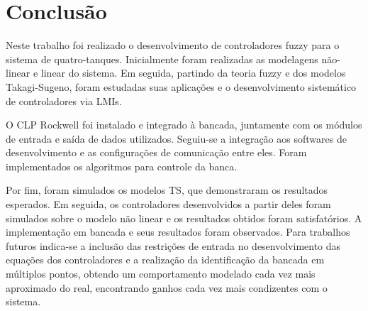 %

\chapter{Conclusão} \label{capConclusao}
Neste trabalho foi realizado o desenvolvimento de controladores fuzzy para o sistema de quatro-tanques. Inicialmente foram realizadas as modelagens não-linear e linear do sistema. Em seguida, partindo da teoria fuzzy e dos modelos Takagi-Sugeno, foram estudadas suas aplicações e o desenvolvimento sistemático de controladores via LMIs.

O CLP Rockwell foi instalado e integrado à bancada, juntamente com os módulos de entrada e saída de dados utilizados. Seguiu-se a integração aos softwares de desenvolvimento e as configurações de comunicação entre eles. Foram implementados os algoritmos para controle da banca.

Por fim, foram simulados os modelos TS, que demonstraram os resultados esperados. Em seguida, os controladores desenvolvidos a partir deles foram simulados sobre o modelo não linear e os resultados obtidos foram satisfatórios. A implementação em bancada e seus resultados foram observados.
Para trabalhos futuros indica-se a inclusão das restrições de entrada no desenvolvimento das equações dos controladores e a realização da identificação da bancada em múltiplos pontos, obtendo um comportamento modelado cada vez mais aproximado do real, encontrando ganhos cada vez mais condizentes com o sistema.


%

